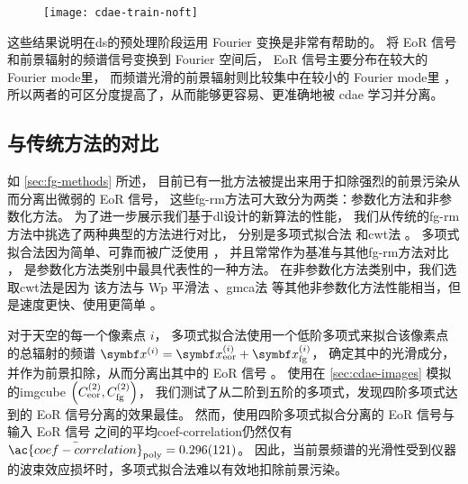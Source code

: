\begin{figure}[htp]
  \centering
  \texttt{[image: cdae-train-noft]}
  \label{fig:cdae-train-noft}
\end{figure}

这些结果说明在\ac{ds}的预处理阶段运用 Fourier 变换是非常有帮助的。
将 EoR 信号和前景辐射的频谱信号变换到 Fourier 空间后，
EoR 信号主要分布在较大的 Fourier \ac{mode}里，
而频谱光滑的前景辐射则比较集中在较小的 Fourier \ac{mode}里 \cite{parsons2012}，
所以两者的可区分度提高了，从而能够更容易、更准确地被 \ac{cdae} 学习并分离。

\subsection{与传统方法的对比}

如 \autoref{sec:fg-methods} 所述，
目前已有一批方法被提出来用于扣除强烈的前景污染从而分离出微弱的 EoR 信号，
这些\ac{fg-rm}方法可大致分为两类：参数化方法和非参数化方法。
为了进一步展示我们基于\ac{dl}设计的新算法的性能，
我们从传统的\ac{fg-rm}方法中挑选了两种典型的方法进行对比，
分别是多项式拟合法\cite{wang2006} 和\ac{cwt}法 \cite{gu2013}。
多项式拟合法因为简单、可靠而被广泛使用 \cite{jelic2008,liu2009ps,pritchard2010}，
并且常常作为基准与其他\ac{fg-rm}方法对比 \cite{harker2009,alonso2015,chapman2015}，
是参数化方法类别中最具代表性的一种方法。
在非参数化方法类别中，我们选取\ac{cwt}法是因为
该方法与 Wp 平滑法 \cite{harker2009}、\ac{gmca}法 \cite{chapman2013}
等其他非参数化方法性能相当，但是速度更快、使用更简单 \cite{gu2013,chapman2015}。

对于天空的每一个像素点 $i$，
多项式拟合法使用一个低阶多项式来拟合该像素点的总辐射的频谱
$\B{x}^{(i)} = \B{x}^{(i)}_{\R{eor}} + \B{x}^{(i)}_{\R{fg}}$，
确定其中的光滑成分，并作为前景扣除，从而分离出其中的 EoR 信号 \cite{wang2006}。
使用在 \autoref{sec:cdae-images} 模拟的\ac{imgcube}
$\left( C_{\mathrm{eor}}^{(2)}, C_{\mathrm{fg}}^{(2)} \right)$，
我们测试了从二阶到五阶的多项式，发现四阶多项式达到的 EoR 信号分离的效果最佳。
然而，使用四阶多项式拟合分离的 EoR 信号与输入 EoR 信号
之间的平均\acl{coef-correlation}仍然仅有
$\bar{\ac{coef-correlation}}_{\R{poly}} = \num{0.296 +- 0.121}$。
因此，当前景频谱的光滑性受到仪器的波束效应损坏时，多项式拟合法难以有效地扣除前景污染。

